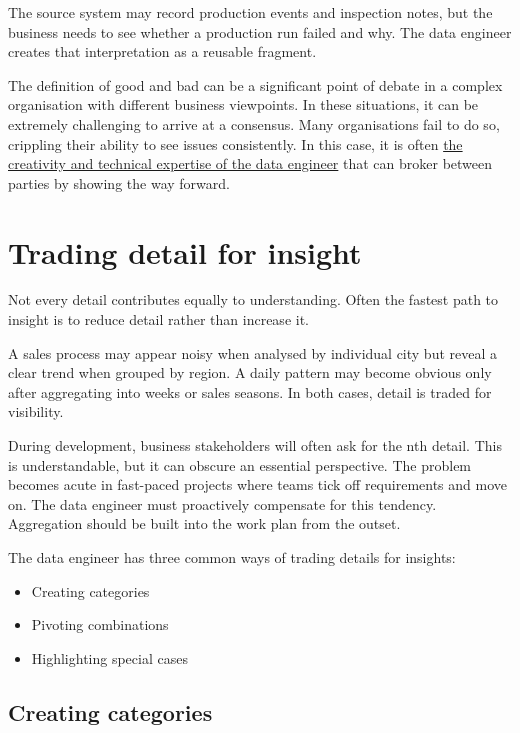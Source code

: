 \documentclass[10pt,openany,10pt]{book}
\providecommand{\tightlist}{%
  \setlength{\itemsep}{0pt}\setlength{\parskip}{0pt}}
\begin{document}
The source system may record production events and inspection notes, but
the business needs to see whether a production run failed and why. The
data engineer creates that interpretation as a reusable fragment.

The definition of good and bad can be a significant point of debate in a
complex organisation with different business viewpoints. In these
situations, it can be extremely challenging to arrive at a consensus.
Many organisations fail to do so, crippling their ability to see issues
consistently. In this case, it is often
\hyperref[docs-foundations-data-and-organisations]{the creativity and
technical expertise of the data engineer} that can broker between
parties by showing the way forward.

\section{Trading detail for insight}\label{trading-detail-for-insight}

Not every detail contributes equally to understanding. Often the fastest
path to insight is to reduce detail rather than increase it.

A sales process may appear noisy when analysed by individual city but
reveal a clear trend when grouped by region. A daily pattern may become
obvious only after aggregating into weeks or sales seasons. In both
cases, detail is traded for visibility.

During development, business stakeholders will often ask for the nth
detail. This is understandable, but it can obscure an essential
perspective. The problem becomes acute in fast-paced projects where
teams tick off requirements and move on. The data engineer must
proactively compensate for this tendency. Aggregation should be built
into the work plan from the outset.

The data engineer has three common ways of trading details for insights:

\begin{itemize}
\tightlist
\item
  Creating categories
\item
  Pivoting combinations
\item
  Highlighting special cases
\end{itemize}

\subsection{Creating categories}\label{creating-categories}
\end{document}
